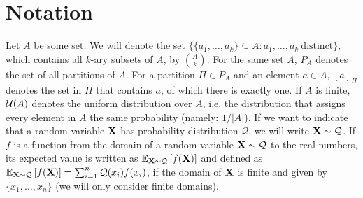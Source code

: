 
\section{Notation}
Let $A$ be some set. We will denote the set $\{ \{ a_1, \dots, a_k \} \subseteq A : a_1,\dots,a_k\ \text{distinct}\},$ which contains all $k$-ary subsets of $A$, by $\binom{A}{k}$. For the same set $A$, $P_A$ denotes the set of all partitions of $A$. For a partition $\Pi \in P_A$ and an element $a \in A$, $[a]_\Pi$ denotes the set in $\Pi$ that contains $a$, of which there is exactly one. If $A$ is finite, $\mathcal{U}(A)$ denotes the uniform distribution over $A$, i.e. the distribution that assigns every element in $A$ the same probability (namely: $1/|A|$). If we want to indicate that a random variable ${\bf X}$ has probability distribution $\mathcal{Q}$, we will write ${\bf X} \sim \mathcal{Q}$. If $f$ is a function from the domain of a random variable ${\bf X} \sim \mathcal{Q}$ to the real numbers, its expected value is written as $\mathbb{E}_{{\bf X} \sim \mathcal{Q}}\left[f({\bf X})\right]$ and defined as $\mathbb{E}_{{\bf X} \sim \mathcal{Q}} \left[f({\bf X})\right] = \sum_{i=1}^n \mathcal{Q}(x_i) f(x_i)$, if the domain of ${\bf X}$ is finite and given by $\{x_1,\dots,x_n\}$ (we will only consider finite domains).


